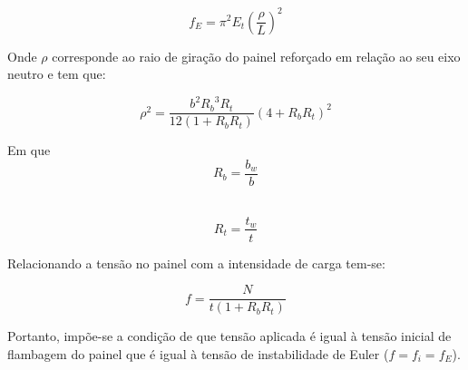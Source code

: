 \begin{equation} \label{InitialEuler}
f_E = {\pi^2}E_t(\dfrac{\rho}{L})^2
\end{equation}

Onde $\rho$ corresponde ao raio de giração do painel reforçado em relação ao seu eixo neutro e tem que:

\begin{equation} \label{giracao}
{\rho^2} = {\dfrac{b^2{R_b}^3R_t}{12(1+R_bR_t)}}(4+R_bR_t)^2
\end{equation}

Em que
\begin{equation} \label{Rb}
R_b = \dfrac{b_w}{b}
\end{equation}
\

\begin{equation} \label{Rt}
R_t = \dfrac{t_w}{t}
\end{equation}

Relacionando a tensão no painel com a intensidade de carga tem-se:

\begin{equation} \label{StressPanel}
f = \dfrac{N}{t(1+R_bR_t)}
\end{equation}

Portanto, impõe-se a condição de que tensão aplicada é igual à tensão inicial de flambagem do painel que é igual à tensão de instabilidade de Euler ($f=f_i=f_E$).

